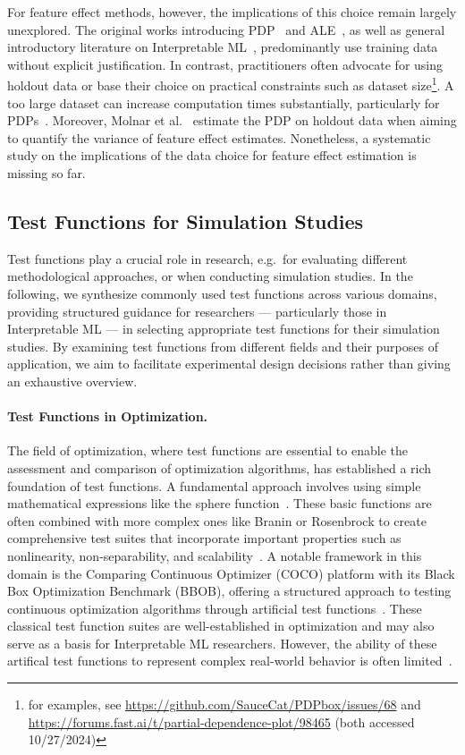 \documentclass[runningheads]{llncs}
\begin{document}
For feature effect methods, however, the implications of this choice remain
largely unexplored. The original works introducing
PDP~\cite{friedman_greedy_2001} and ALE~\cite{apley_visualizing_2020}, as well
as general introductory literature on Interpretable
ML~\cite{molnar_interpretable_2022}, predominantly use training data without
explicit justification. In contrast, practitioners often advocate for using
holdout data or base their choice on practical constraints such as dataset
size\footnote{for examples, see
    \url{https://github.com/SauceCat/PDPbox/issues/68} and
    \url{https://forums.fast.ai/t/partial-dependence-plot/98465} (both accessed
    10/27/2024)}. A too large dataset can increase computation times substantially,
particularly for PDPs~\cite{friedman_greedy_2001}. Moreover, Molnar et
al.~\cite{molnar_relating_2023} estimate the PDP on holdout data when aiming to
quantify the variance of feature effect estimates. Nonetheless, a systematic
study on the implications of the data choice for feature effect estimation is
missing so far.

\subsection{Test Functions for Simulation Studies}\label{sec:test-functions}

Test functions play a crucial role in research, e.g.\ for evaluating different
methodological approaches, or when conducting simulation studies. In the
following, we synthesize commonly used test functions across various domains,
providing structured guidance for researchers --- particularly those in
Interpretable ML --- in selecting appropriate test functions for their
simulation studies. By examining test functions from different fields and their
purposes of application, we aim to facilitate experimental design decisions
rather than giving an exhaustive overview.

\paragraph{Test Functions in Optimization.}
The field of optimization, where test functions are essential to enable the
assessment and comparison of optimization algorithms, has established a rich
foundation of test functions. A fundamental approach involves using simple
mathematical expressions like the sphere function~\cite{more_testing_1981}.
These basic functions are often combined with more complex ones like Branin or
Rosenbrock to create comprehensive test suites that incorporate important
properties such as nonlinearity, non-separability, and
scalability~\cite{whitley_building_1998}. A notable framework in this domain is
the Comparing Continuous Optimizer (COCO) platform with its Black Box
Optimization Benchmark (BBOB), offering a structured approach to testing
continuous optimization algorithms through artificial test
functions~\cite{hansen_coco_2016}. These classical test function suites are
well-established in optimization and may also serve as a basis for
Interpretable ML researchers. However, the ability of these artifical test
functions to represent complex real-world behavior is often
limited~\cite{zaefferer_simulation-based_2017}.
\end{document}
